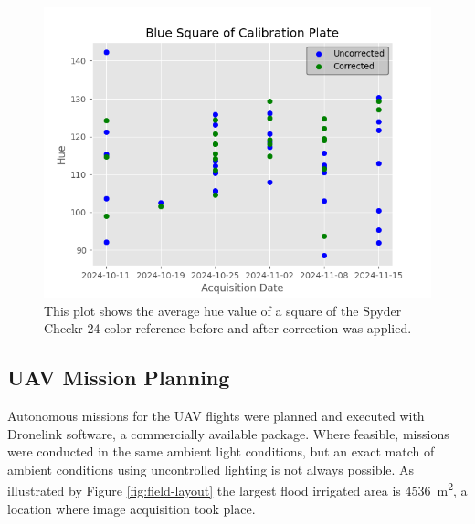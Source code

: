 \documentclass[letterpaper, notitlepage]{report}
\begin{document}
\begin{figure}[!htb]
	\centering
	\includegraphics[width=0.7\linewidth]{./figures/plot-calibration.png}
	\caption[Color correction over a portion of a growth cycle]{This plot shows the average hue value of a square of the Spyder Checkr 24 color reference before and after correction was applied.}
	\label{fig:calibration-plot}
\end{figure}

\subsection{UAV Mission Planning}
Autonomous missions for the  UAV flights were planned and executed with Dronelink software, a commercially available package.  Where feasible, missions were conducted in the same ambient light conditions, but an exact match of ambient conditions using uncontrolled lighting is not always possible.
As illustrated by Figure \ref{fig:field-layout} the largest flood irrigated area is \SI{4536}{\metre\squared}, a location where image acquisition took place.  
\end{document}
